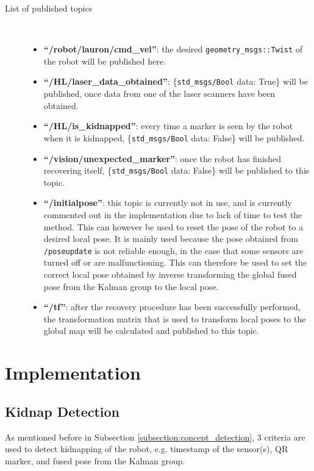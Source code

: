 \begin{description}	
\item[List of published topics]\
	\begin{itemize}
	\item \textbf{``/robot/lauron/cmd\_vel''}: the desired \texttt{geometry\_msgs::Twist} of the robot will be published here.
	\item \textbf{``/HL/laser\_data\_obtained''}: \{\texttt{std\_msgs/Bool} data: True\} will be published, once data from one of the laser scanners have been obtained.
	\item \textbf{``/HL/is\_kidnapped''}: every time a marker is seen by the robot when it is kidnapped, \{\texttt{std\_msgs/Bool} data: False\} will be published.
	\item \textbf{``/vision/unexpected\_marker''}: once the robot has finished recovering itself, \{\texttt{std\_msgs/Bool} data: False\} will be published to this topic.
	\item \textbf{``/initialpose''}: this topic is currently not in use, and is currently commented out in the implementation due to lack of time to test the method. This can however be used to reset the pose of the robot to a desired local pose. It is mainly used because the pose obtained from \texttt{/poseupdate} is not reliable enough, in the case that some sensors are turned off or are malfunctioning. This can therefore be used to set the correct local pose obtained by inverse transforming the global fused pose from the Kalman group to the local pose.
	\item \textbf{``/tf''}: after the recovery procedure has been successfully performed, the transformation matrix that is used to transform local poses to the global map will be calculated and published to this topic.
	\end{itemize}
\end{description}

\section{Implementation}\label{implementation}

\subsection{Kidnap Detection}\label{subsection:implementation_detection} 
As mentioned before in Subsection \ref{subsection:concept_detection}, 3 criteria are used to detect kidnapping of the robot, e.g. timestamp of the sensor(s), QR marker, and fused pose from the Kalman group. 

